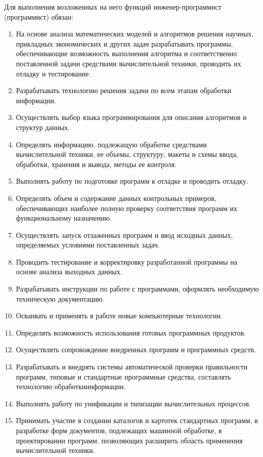 \documentclass[a4paper,draft]{report}
\begin{document}
\begin{enumerate}
          Для выполнения возложенных на него функций инженер-программист (программист) обязан:
          \begin{enumerate}
              \item На основе анализа математических моделей и алгоритмов решения научных, прикладных экономических и других задач разрабатывать программы, обеспечивающие возможность выполнения алгоритма и соответственно поставленной задачи средствами вычислительной техники, проводить их отладку и тестирование.
              \item Разрабатывать технологию решения задачи по всем этапам обработки информации.
              \item Осуществлять выбор языка программирования для описания алгоритмов и структур данных.
              \item Определять информацию, подлежащую обработке средствами вычислительной техники, ее объемы, структуру, макеты и схемы ввода, обработки, хранения и вывода, методы ее контроля.
              \item Выполнять работу по подготовке программ к отладке и проводить отладку.
              \item Определять объем и содержание данных контрольных примеров, обеспечивающих наиболее полную проверку соответствия программ их функциональному назначению.
              \item Осуществлять запуск отлаженных программ и ввод исходных данных, определяемых условиями поставленных задач.
              \item Проводить тестирование и корректировку разработанной программы на основе анализа выходных данных.
              \item Разрабатывать инструкции по работе с программами, оформлять необходимую техническую документацию.
              \item Осваивать и применять в работе новые компьютерные технологии.
              \item Определять возможность использования готовых программных продуктов.
              \item Осуществлять сопровождение внедренных программ и программных средств.
              \item Разрабатывать и внедрять системы автоматической проверки правильности программ, типовые и стандартные программные средства, составлять технологию обработкиинформации.
              \item Выполнять работу по унификации и типизации вычислительных процессов.
              \item Принимать участие в создании каталогов и картотек стандартных программ, в разработке форм документов, подлежащих машинной обработке, в проектировании программ, позволяющих расширить область применения вычислительной техники.
          \end{enumerate}


\end{enumerate}
\end{document}
